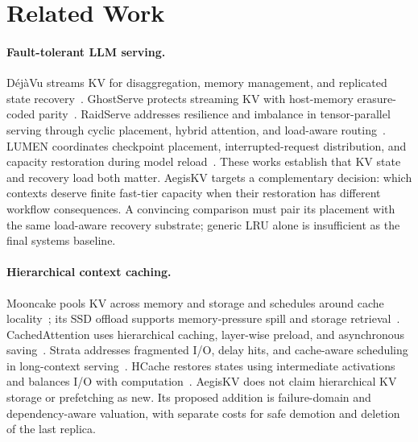 \documentclass[sigplan,10pt,anonymous,nonacm]{acmart}
\begin{document}
\section{Related Work}
\label{sec:related}

\paragraph{Fault-tolerant LLM serving.}
D\'ej\`aVu streams KV for disaggregation, memory management, and replicated
state recovery~\cite{strati2024dejavu}. GhostServe protects streaming KV
with host-memory erasure-coded parity~\cite{jayakody2026ghostserve}.
RaidServe addresses resilience and imbalance in tensor-parallel serving
through cyclic placement, hybrid attention, and load-aware
routing~\cite{xu2026raidserve}. LUMEN coordinates checkpoint placement,
interrupted-request distribution, and capacity restoration during model
reload~\cite{cao2026lumen}. These works establish that KV state and
recovery load both matter. AegisKV targets a complementary decision:
which contexts deserve finite fast-tier capacity when their restoration
has different workflow consequences. A convincing comparison must pair
its placement with the same load-aware recovery substrate; generic LRU
alone is insufficient as the final systems baseline.

\paragraph{Hierarchical context caching.}
Mooncake pools KV across memory and storage and schedules around cache
locality~\cite{qin2025mooncake}; its SSD offload supports memory-pressure
spill and storage retrieval~\cite{mooncake2026ssdoffload}. CachedAttention
uses hierarchical caching, layer-wise preload, and asynchronous
saving~\cite{gao2024cachedattention}. Strata addresses fragmented I/O,
delay hits, and cache-aware scheduling in long-context
serving~\cite{xie2026strata}. HCache restores states using intermediate
activations and balances I/O with computation~\cite{gao2025hcache}.
AegisKV does not claim hierarchical KV storage or prefetching as new.
Its proposed addition is failure-domain and dependency-aware valuation,
with separate costs for safe demotion and deletion of the last replica.
\end{document}
